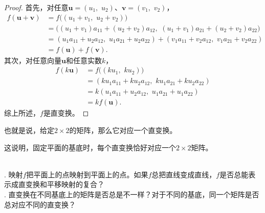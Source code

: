 \documentclass[12pt,UTF8]{ctexbook}
\begin{document}
\begin{proof}
    首先，对任意$\mathbf{u} = (u_1,\,\, u_2)$、$\mathbf{v} = (v_1,\,\,v_2)$，
    \begin{align*}
        f (\mathbf{u} + \mathbf{v}) &= f \big((u_1 + v_1,\,\, u_2 + v_2)\big)  \\
        &= \Big((u_1 + v_1)a_{11} + (u_2 + v_2)a_{12},\,\,(u_1 + v_1)a_{21} + (u_2 + v_2)a_{22}\Big) \\
        &= (u_1a_{11} + u_2a_{12},\,\,u_1a_{21} + u_2a_{22}) + (v_1a_{11} + v_2a_{12},\,\,v_1a_{21} + v_2a_{22}) \\
        &= f (\mathbf{u}) + f (\mathbf{v}). 
    \end{align*}
    其次，对任意向量$\mathbf{u}$和任意实数$k$，
    \begin{align*}
        f (k\mathbf{u}) &= f \big((ku_1,\,\, ku_2)\big)  \\
        &= (ku_1a_{11} + ku_2a_{12},\,\,ku_1a_{21} + ku_2a_{22}) \\
        &= k(u_1a_{11} + u_2a_{12},\,\,u_1a_{21} + u_1a_{22}) \\
        &= kf (\mathbf{u}). 
    \end{align*}  
    综上所述，$f$是直变换。
\end{proof}

也就是说，给定$2\times 2$的矩阵，那么它对应一个直变换。

这说明，固定平面的基底时，每个直变换恰好对应一个$2\times 2$矩阵。

\begin{sk}
    \mbox{} \\
    . 映射$f$把平面上的点映射到平面上的点。如果$f$总把直线变成直线，$f$是否总能表示成直变换和平移映射的复合？\\
    . 直变换在不同基底上的矩阵是否总是不一样？对于不同的基底，同一个矩阵是否总对应不同的直变换？
\end{sk}
\end{document}
